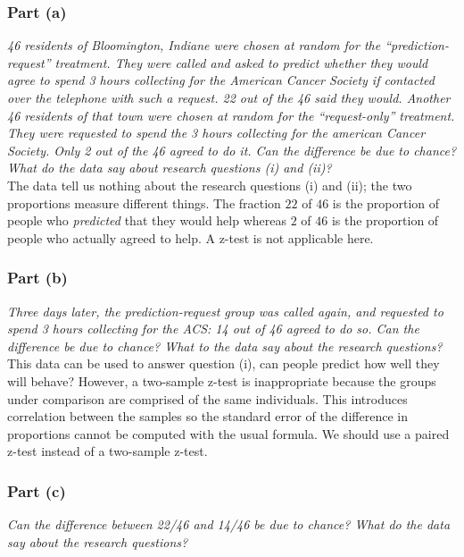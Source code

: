 \documentclass[11pt]{article}
\begin{document}
\subsubsection*{Part (a)}
\noindent \textit{46 residents of Bloomington, Indiane were chosen at random for the ``prediction-request'' treatment. They were called and asked to predict whether they would agree to spend 3 hours collecting for the American Cancer Society if contacted over the telephone with such a request. 22 out of the 46 said they would. Another 46 residents of that town were chosen at random for the ``request-only'' treatment. They were requested to spend the 3 hours collecting for the american Cancer Society. Only 2 out of the 46 agreed to do it. Can the difference be due to chance? What do the data say about research questions (i) and (ii)?}\\

The data tell us nothing about the research questions (i) and (ii); the two proportions measure different things.  The fraction $22$ of $46$ is the proportion of people who \textit{predicted} that they would help whereas $2$ of $46$ is the proportion of people who actually agreed to help.  A z-test is not applicable here.

\subsubsection*{Part (b)}
\noindent \textit{Three days later, the prediction-request group was called again, and requested to spend 3 hours collecting for the ACS: 14 out of 46 agreed to do so. Can the difference be due to chance? What to the data say about the research questions?}\\

This data can be used to answer question (i), can people predict how well they will behave?  However, a two-sample z-test is inappropriate because the groups under comparison are comprised of the same individuals.  This introduces correlation between the samples so the standard error of the difference in proportions cannot be computed with the usual formula.  We should use a paired z-test instead of a two-sample z-test.

\subsubsection*{Part (c)}
\textit{Can the difference between 22/46 and 14/46 be due to chance? What do the data say about the research questions?}\\
\end{document}
